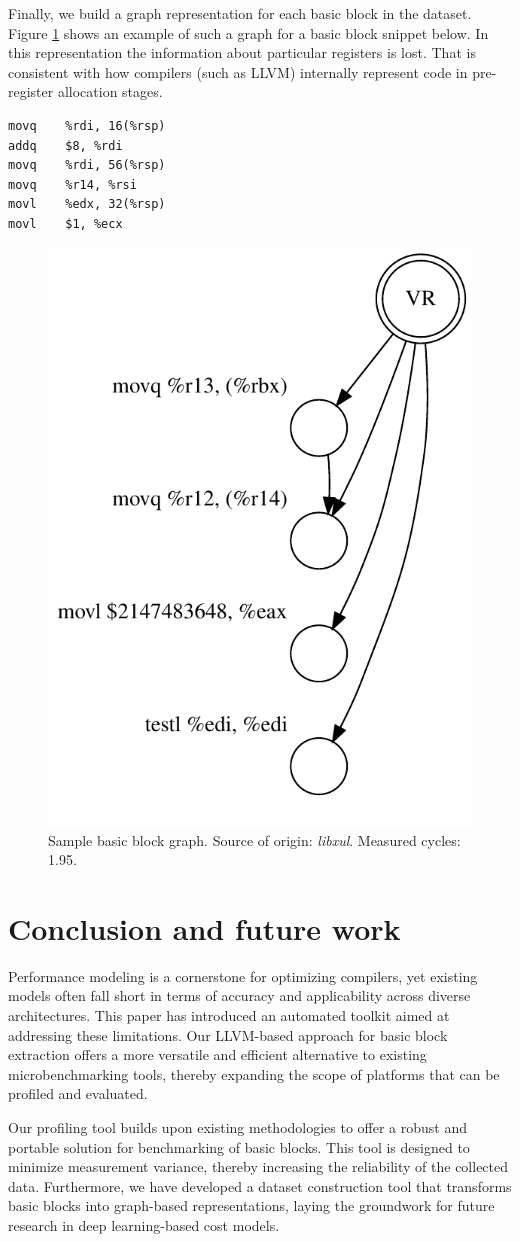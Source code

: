 Finally, we build a graph representation for each basic block in the dataset. 
Figure \ref{fig:sample_graph} shows an example of such a graph for a basic block snippet below.
In this representation the information about particular registers is lost. That is consistent
with how compilers (such as LLVM) internally represent code in pre-register allocation stages.

\begin{lstlisting}[title={Source of the sample basic block}]
movq	%rdi, 16(%rsp)
addq	$8, %rdi
movq	%rdi, 56(%rsp)
movq	%r14, %rsi
movl	%edx, 32(%rsp)
movl	$1, %ecx
\end{lstlisting}

\begin{figure}[h]
  \centering
  \includegraphics[width=0.4\columnwidth]{sample_graph}
  \caption{Sample basic block graph. Source of origin: \textit{libxul}. Measured cycles: 1.95.}
  \label{fig:sample_graph}
\end{figure}

\section{Conclusion and future work}

Performance modeling is a cornerstone for optimizing compilers, yet existing models often 
fall short in terms of accuracy and applicability across diverse architectures. This paper 
has introduced an automated toolkit aimed at addressing these limitations. Our LLVM-based 
approach for basic block extraction offers a more versatile and efficient alternative to existing 
microbenchmarking tools, thereby expanding the scope of platforms that can be profiled and evaluated. 

Our profiling tool builds upon existing methodologies to offer a robust and portable solution for 
benchmarking of basic blocks. This tool is designed to minimize measurement variance, thereby 
increasing the reliability of the collected data. Furthermore, we have developed a dataset construction 
tool that transforms basic blocks into graph-based representations, laying the groundwork for future 
research in deep learning-based cost models.

